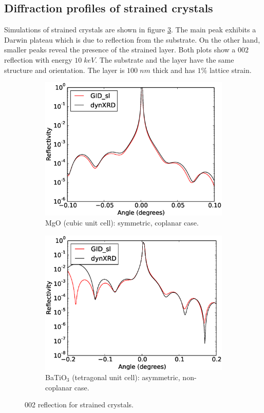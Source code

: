 \documentclass[12pt,oneside,notitlepage,abstracton,a4paper]{scrartcl}
\begin{document}
\subsection{Diffraction profiles of strained crystals}\label{res2}

Simulations of strained crystals are shown in figure \ref{testsstrain}. The main peak exhibits a Darwin plateau which is due to reflection from the substrate. On the other hand, smaller peaks reveal the presence of the strained layer. Both plots show a $002$ reflection with energy $10\; keV$. The substrate and the layer have the same structure and orientation. The layer is $100\; nm$ thick and has $1\%$ lattice strain.
\begin{figure}[h]
 \centering
 \begin{subfigure}[h]{0.49\textwidth}
  \includegraphics[width=\textwidth]{pics/test12.eps}
  \caption{MgO (cubic unit cell): symmetric, coplanar case.}\label{test12}
  \label{test12}
 \end{subfigure}
 \begin{subfigure}[h]{0.49\textwidth}
  \includegraphics[width=\textwidth]{pics/test14.eps}
  \caption{BaTiO$ _3$ (tetragonal unit cell): asymmetric, non-coplanar case.}\label{test14}
  \label{test14}
 \end{subfigure}
 \caption{002 reflection for strained crystals.}\label{testsstrain}
\end{figure}
\end{document}
